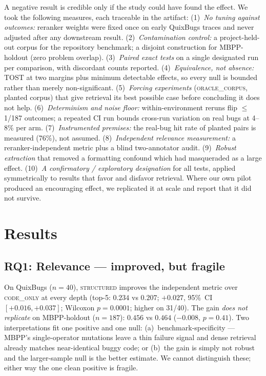 \documentclass[10pt,conference]{IEEEtran}
\newcommand{\structured}{\textsc{structured}\xspace}
\newcommand{\codeonly}{\textsc{code\_only}\xspace}
\newcommand{\oraclecorpus}{\textsc{oracle\_corpus}\xspace}
\begin{document}
A negative result is credible only if the study could have found the
effect. We took the following measures, each traceable in the artifact:
(1)~\emph{No tuning against outcomes:} reranker weights were fixed once on
early QuixBugs traces and never adjusted after any downstream result.
(2)~\emph{Contamination control:} a project-held-out corpus for the
repository benchmark; a disjoint construction for MBPP-holdout (zero
problem overlap). (3)~\emph{Paired exact tests} on a single designated run
per comparison, with discordant counts reported. (4)~\emph{Equivalence, not
absence:} TOST at two margins plus minimum detectable effects, so every
null is bounded rather than merely non-significant. (5)~\emph{Forcing
experiments} (\oraclecorpus, planted corpus) that give retrieval its best
possible case before concluding it does not help. (6)~\emph{Determinism and
noise floor:} within-environment reruns flip $\le$1/187 outcomes; a
repeated CI run bounds cross-run variation on real bugs at 4--8\% per arm.
(7)~\emph{Instrumented premises:} the real-bug hit rate of planted pairs
is measured (76\%), not assumed. (8)~\emph{Independent relevance
measurement:} a reranker-independent metric plus a blind two-annotator
audit. (9)~\emph{Robust extraction} that removed a formatting confound
which had masqueraded as a large effect. (10)~\emph{A confirmatory /
exploratory designation} for all tests, applied symmetrically to results
that favor and disfavor retrieval. Where our own pilot produced an
encouraging effect, we replicated it at scale and report that it did not
survive.

\section{Results}
\label{sec:results}

\subsection{RQ1: Relevance --- improved, but fragile}

On QuixBugs ($n{=}40$), \structured improves the independent metric over
\codeonly at every depth (top-5: $0.234$ vs $0.207$; $+0.027$, 95\%~CI
$[+0.016,+0.037]$; Wilcoxon $p{=}0.0001$; higher on 31/40). The gain
\emph{does not replicate} on MBPP-holdout ($n{=}187$): $0.456$ vs $0.464$
($-0.008$, $p{=}0.41$). Two interpretations fit one positive and one null:
(a)~benchmark-specificity --- MBPP's single-operator mutations leave a thin
failure signal and dense retrieval already matches near-identical buggy
code; or (b)~the gain is simply not robust and the larger-sample null is the
better estimate. We cannot distinguish these; either way the one clean
positive is fragile.
\end{document}

